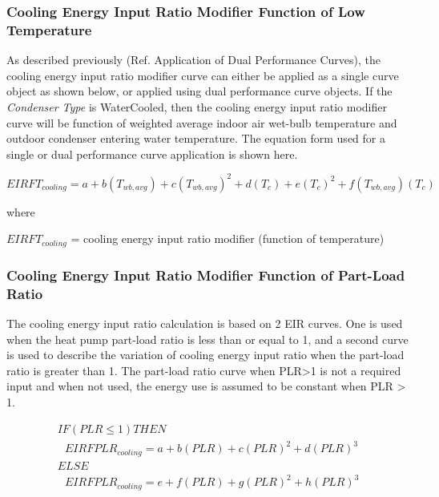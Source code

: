 \subsubsection{Cooling Energy Input Ratio Modifier Function of Low Temperature}\label{cooling-energy-input-ratio-modifier-function-of-low-temperature}

As described previously (Ref. Application of Dual Performance Curves), the cooling energy input ratio modifier curve can either be applied as a single curve object as shown below, or applied using dual performance curve objects. If the \textit{Condenser Type} is WaterCooled, then the cooling energy input ratio modifier curve will be function of weighted average indoor air wet-bulb temperature and outdoor condenser entering water temperature. The equation form used for a single or dual performance curve application is shown here.

\begin{equation}
  EIRFT_{cooling} = a + b \left( T_{wb,avg} \right) + c \left( T_{wb,avg} \right)^2 + d \left( T_c \right) + e \left( T_c \right)^2 + f \left( T_{wb,avg} \right) \left( T_c \right)
\end{equation}

where

\(EIRFT_{cooling}\) = cooling energy input ratio modifier (function of temperature)

\subsubsection{Cooling Energy Input Ratio Modifier Function of Part-Load Ratio}\label{cooling-energy-input-ratio-modifier-function-of-part-load-ratio}

The cooling energy input ratio calculation is based on 2 EIR curves. One is used when the heat pump part-load ratio is less than or equal to 1, and a second curve is used to describe the variation of cooling energy input ratio when the part-load ratio is greater than 1. The part-load ratio curve when PLR>1 is not a required input and when not used, the energy use is assumed to be constant when PLR > 1.

\begin{equation}
  \begin{array}{l}
  IF\left( {PLR \le 1} \right)THEN \\
  \,\,\,\,EIRFPLR_{cooling} = a + b \left( PLR \right) + c \left( PLR \right)^2 + d \left( PLR \right)^3 \\
  ELSE \\
  \,\,\,\,EIRFPLR_{cooling} = e + f \left( PLR \right) + g \left( PLR \right)^2 + h \left( PLR \right)^3
  \end{array}
\end{equation}

